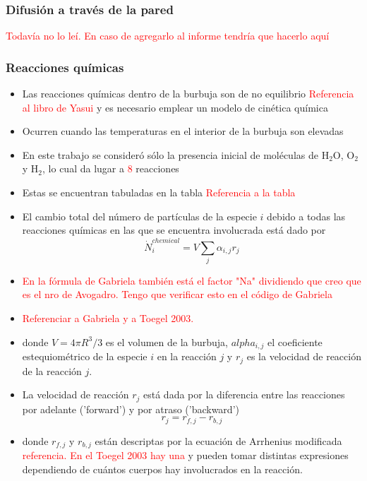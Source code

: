 \documentclass[aps,prb,twocolumn,superscriptaddress,floatfix,longbibliography,10pt]{revtex4-2}
\newif\ifptitle
\newif\ifpnumber
\newcounter{para}
\newcommand\ptitle[1]{\par\refstepcounter{para}
{\ifpnumber{\noindent\textcolor{lightgray}{\textbf{\thepara}}\indent}\fi}
{\ifptitle{\textbf{[{#1}]}}\fi}}
\begin{document}
\subsubsection{Difusión a través de la pared}
\textcolor{red}{Todavía no lo leí. En caso de agregarlo al informe tendría que hacerlo aquí}



\subsubsection{Reacciones químicas}


\ptitle{Presentación de $\dot{N}_i^{chemical}$}
\begin{itemize}
  \item Las reacciones químicas dentro de la burbuja son de no equilibrio \textcolor{red}{Referencia al libro de Yasui} y es necesario emplear un modelo de cinética química
  \item Ocurren cuando las temperaturas en el interior de la burbuja son elevadas
  \item En este trabajo se consideró sólo la presencia inicial de moléculas de $\mathrm{H_2O}$, $\mathrm{O_2}$ y $\mathrm{H_2}$, lo cual da lugar a \textcolor{red}{8} reacciones
  \item Estas se encuentran tabuladas en la tabla \textcolor{red}{Referencia a la tabla}
  \item El cambio total del número de partículas de la especie $i$ debido a todas las reacciones químicas en las que se encuentra involucrada está dado por
  \[\dot{N}_i^{chemical} = V \sum_j{\alpha_{i,j} r_j} \]
  \item \textcolor{red}{En la fórmula de Gabriela también está el factor "Na" dividiendo que creo que es el nro de Avogadro. Tengo que verificar esto en el código de Gabriela}
  \item \textcolor{red}{Referenciar a Gabriela y a Toegel 2003.}
  \item donde $V = 4 \pi R^3 /3$ es el volumen de la burbuja, $alpha_{i,j}$ el coeficiente estequiométrico de la especie $i$ en la reacción $j$ y $r_j$ es la velocidad de reacción de la reacción $j$.
\end{itemize}

\ptitle{Velocidad de reacción}
\begin{itemize}
  \item La velocidad de reacción $r_j$ está dada por la diferencia entre las reacciones por adelante ('forward') y por atraso ('backward')
  \[r_{j} = r_{f,j} - r_{b,j} \]
  \item donde $r_{f,j}$ y $r_{b,j}$ están descriptas por la ecuación de Arrhenius modificada \textcolor{red}{referencia. En el Toegel 2003 hay una} y pueden tomar distintas expresiones dependiendo de cuántos cuerpos hay involucrados en la reacción. 
\end{itemize}
\end{document}
